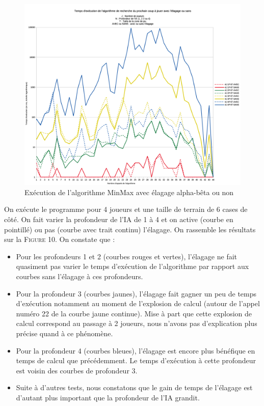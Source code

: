 \documentclass[11pt,a4paper]{article}
\begin{document}
\begin{figure}[h]
\begin{center}
\includegraphics[width=1\textwidth]{figures/elagage/alphabetacourbe.png}
\caption{Exécution de l'algorithme MinMax avec élagage alpha-bêta ou non}
\label{fig:creer}
\end{center}
\end{figure}

On exécute le programme pour 4 joueurs et une taille de terrain de 6 cases de côté. On fait varier la profondeur de l'IA de 1 à 4 et on active (courbe en pointillé) ou pas (courbe avec trait continu) l'élagage. On rassemble les résultats sur la \textsc{Figure} 10. On constate que :

\vspace{10px}

\begin{itemize}[5px]
    \item Pour les profondeurs 1 et 2 (courbes rouges et vertes), l'élagage ne fait quasiment pas varier le temps d'exécution de l'algorithme par rapport aux courbes sans l'élagage à ces profondeurs.
    \item Pour la profondeur 3 (courbes jaunes), l'élagage fait gagner un peu de temps d'exécution notamment au moment de l'explosion de calcul (autour de l'appel numéro 22 de la courbe jaune continue). Mise à part que cette explosion de calcul correspond au passage à 2 joueurs, nous n'avons pas d'explication plus précise quand à ce phénomène.
    \item Pour la profondeur 4 (courbes bleues), l'élagage est encore plus bénéfique en temps de calcul que précédemment. Le temps d'exécution à cette profondeur est voisin des courbes de profondeur 3.
    \item Suite à d'autres tests, nous constatons que le gain de temps de l'élagage est d'autant plus important que la profondeur de l'IA grandit.
\end{itemize}
\end{document}
